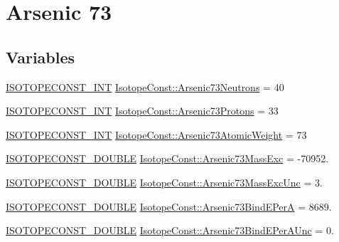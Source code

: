 \hypertarget{group___isotope_const-_arsenic-_as73}{}\section{Arsenic 73}
\label{group___isotope_const-_arsenic-_as73}
\subsection*{Variables}
\begin{DoxyCompactItemize}
\item 
\mbox{\hyperlink{group___isotope_const-_macros_ga5f18360b3e99483a35c32d789e62621c}{I\+S\+O\+T\+O\+P\+E\+C\+O\+N\+S\+T\+\_\+\+I\+NT}} \mbox{\hyperlink{group___isotope_const-_arsenic-_as73_gaddc31edf77b6f5d9ad7cc06d0a76fdce}{Isotope\+Const\+::\+Arsenic73\+Neutrons}} = 40
\item 
\mbox{\hyperlink{group___isotope_const-_macros_ga5f18360b3e99483a35c32d789e62621c}{I\+S\+O\+T\+O\+P\+E\+C\+O\+N\+S\+T\+\_\+\+I\+NT}} \mbox{\hyperlink{group___isotope_const-_arsenic-_as73_ga19dd51ca250b1a2b42d004c59ec44149}{Isotope\+Const\+::\+Arsenic73\+Protons}} = 33
\item 
\mbox{\hyperlink{group___isotope_const-_macros_ga5f18360b3e99483a35c32d789e62621c}{I\+S\+O\+T\+O\+P\+E\+C\+O\+N\+S\+T\+\_\+\+I\+NT}} \mbox{\hyperlink{group___isotope_const-_arsenic-_as73_ga60e8986f758fdf1cf75372afa41e15a0}{Isotope\+Const\+::\+Arsenic73\+Atomic\+Weight}} = 73
\item 
\mbox{\hyperlink{group___isotope_const-_macros_ga8f45a7272ce02c0b4c65c44636ed719a}{I\+S\+O\+T\+O\+P\+E\+C\+O\+N\+S\+T\+\_\+\+D\+O\+U\+B\+LE}} \mbox{\hyperlink{group___isotope_const-_arsenic-_as73_ga1c1323ba0b13fc2749388f4b99bac4ce}{Isotope\+Const\+::\+Arsenic73\+Mass\+Exc}} = -\/70952.
\item 
\mbox{\hyperlink{group___isotope_const-_macros_ga8f45a7272ce02c0b4c65c44636ed719a}{I\+S\+O\+T\+O\+P\+E\+C\+O\+N\+S\+T\+\_\+\+D\+O\+U\+B\+LE}} \mbox{\hyperlink{group___isotope_const-_arsenic-_as73_ga7a2cdcb604f7817bfcba2ab16775df4e}{Isotope\+Const\+::\+Arsenic73\+Mass\+Exc\+Unc}} = 3.
\item 
\mbox{\hyperlink{group___isotope_const-_macros_ga8f45a7272ce02c0b4c65c44636ed719a}{I\+S\+O\+T\+O\+P\+E\+C\+O\+N\+S\+T\+\_\+\+D\+O\+U\+B\+LE}} \mbox{\hyperlink{group___isotope_const-_arsenic-_as73_ga00723d4aa84e8700446eac95eb043576}{Isotope\+Const\+::\+Arsenic73\+Bind\+E\+PerA}} = 8689.
\item 
\mbox{\hyperlink{group___isotope_const-_macros_ga8f45a7272ce02c0b4c65c44636ed719a}{I\+S\+O\+T\+O\+P\+E\+C\+O\+N\+S\+T\+\_\+\+D\+O\+U\+B\+LE}} \mbox{\hyperlink{group___isotope_const-_arsenic-_as73_ga633469a70047746ebb860c5e0911a26c}{Isotope\+Const\+::\+Arsenic73\+Bind\+E\+Per\+A\+Unc}} = 0.

\end{DoxyCompactItemize}
